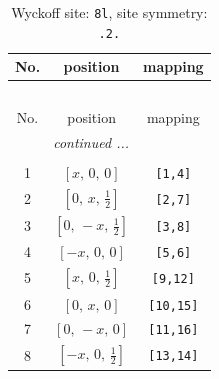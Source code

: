 \documentclass[fleqn,8pt]{jsarticle}
\begin{document}
\begin{longtable}{ccc}
\caption{Wyckoff site: {\tt 8l}, site symmetry: {\tt .2.}}
 \\
 \hline \hline
No. & position & mapping \\ \hline \endfirsthead

\multicolumn{2}{l}{\tablename\ \thetable{}} \\
 \hline \hline
No. & position & mapping \\ \hline \endhead

 \hline \hline
\multicolumn{2}{r}{\footnotesize\it continued ...} \\ \endfoot

 \hline \hline
\multicolumn{2}{r}{} \\ \endlastfoot

1 & $\left[ x,\, 0,\, 0 \right]$ & {\tt [1,4]} \\ \hline
2 & $\left[ 0,\, x,\, \frac{1}{2} \right]$ & {\tt [2,7]} \\ \hline
3 & $\left[ 0,\, - x,\, \frac{1}{2} \right]$ & {\tt [3,8]} \\ \hline
4 & $\left[ - x,\, 0,\, 0 \right]$ & {\tt [5,6]} \\ \hline
5 & $\left[ x,\, 0,\, \frac{1}{2} \right]$ & {\tt [9,12]} \\ \hline
6 & $\left[ 0,\, x,\, 0 \right]$ & {\tt [10,15]} \\ \hline
7 & $\left[ 0,\, - x,\, 0 \right]$ & {\tt [11,16]} \\ \hline
8 & $\left[ - x,\, 0,\, \frac{1}{2} \right]$ & {\tt [13,14]} \\
\end{longtable}
\renewcommand{\arraystretch}{1.2}
\end{document}
